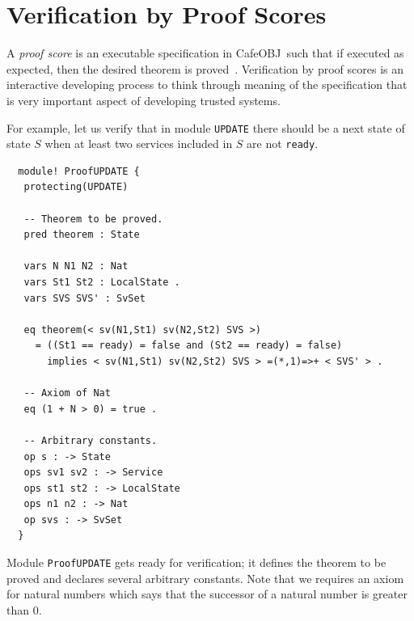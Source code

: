 \documentclass[12pt]{report}
\newcommand{\cafeobj}{{\sf CafeOBJ}~}
\begin{document}
\section{Verification by Proof Scores}
\label{sec:pscore}
A {\it proof score} is an executable specification in \cafeobj such
that if executed as expected, then the desired theorem is
proved~\cite{FutatsugiGO12pps}. Verification by proof scores is an
interactive developing process to think through meaning of the
specification that is very important aspect of developing trusted
systems.

For example, let us verify that in module {\tt UPDATE} there should be
a next state of state $S$ when at least two services included in $S$
are not {\tt ready}.
\begin{verbatim}
  module! ProofUPDATE {
   protecting(UPDATE)
  
   -- Theorem to be proved.
   pred theorem : State
  
   vars N N1 N2 : Nat
   vars St1 St2 : LocalState .
   vars SVS SVS' : SvSet
  
   eq theorem(< sv(N1,St1) sv(N2,St2) SVS >)
     = ((St1 == ready) = false and (St2 == ready) = false)
       implies < sv(N1,St1) sv(N2,St2) SVS > =(*,1)=>+ < SVS' > .
  
   -- Axiom of Nat
   eq (1 + N > 0) = true .
  
   -- Arbitrary constants.
   op s : -> State
   ops sv1 sv2 : -> Service
   ops st1 st2 : -> LocalState
   ops n1 n2 : -> Nat
   op svs : -> SvSet
  }
\end{verbatim}
Module {\tt ProofUPDATE} gets ready for verification; it defines the
theorem to be proved and declares several arbitrary constants.  Note
that we requires an axiom for natural numbers which says that the
successor of a natural number is greater than 0.
\end{document}
